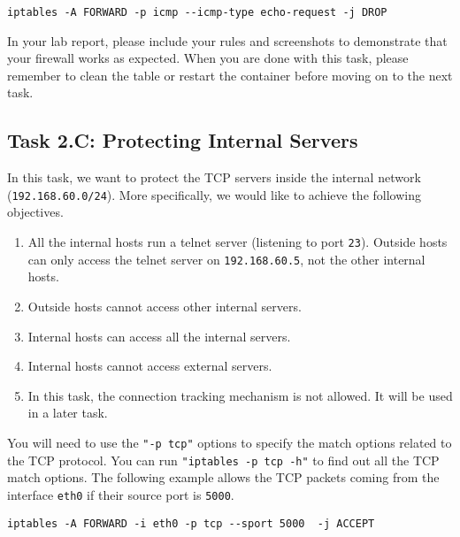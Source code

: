 \begin{lstlisting}
iptables -A FORWARD -p icmp --icmp-type echo-request -j DROP
\end{lstlisting}

In your lab report, please include your rules and  
screenshots to demonstrate that your firewall works as expected.
When you are done with this task,
please remember to clean the table or restart the container 
before moving on to the next task.


\subsection{Task 2.C: Protecting Internal Servers}

In this task, we want to protect the TCP servers 
inside the internal network (\texttt{192.168.60.0/24}). 
More specifically, we would like to achieve the following objectives.

\begin{enumerate}[noitemsep]
  \item All the internal hosts run a telnet server (listening to port \texttt{23}). 
    Outside hosts can only access the telnet server on \texttt{192.168.60.5},
    not the other internal hosts.

  \item Outside hosts cannot access other internal servers. 

  \item Internal hosts can access all the internal servers.

  \item Internal hosts cannot access external servers.

  \item In this task, the connection tracking mechanism is not allowed. 
    It will be used in a later task. 
\end{enumerate}

You will need to use the \texttt{"-p tcp"} options to specify the match
options related to the TCP protocol. You can run 
\texttt{"iptables -p tcp -h"} to find out all the TCP match
options. The following example allows the TCP packets coming from
the interface \texttt{eth0} if their source port is \texttt{5000}.  

\begin{lstlisting}
iptables -A FORWARD -i eth0 -p tcp --sport 5000  -j ACCEPT
\end{lstlisting}


